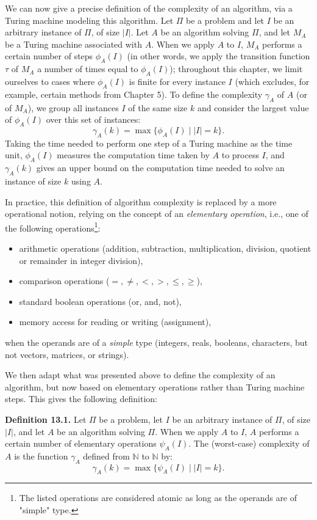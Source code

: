 We can now give a precise definition of the complexity of an algorithm, via a Turing machine modeling this algorithm. Let $\Pi$ be a problem and let $I$ be an arbitrary instance of $\Pi$, of size $|I|$. Let $A$ be an algorithm solving $\Pi$, and let $M_A$ be a Turing machine associated with $A$. When we apply $A$ to $I$, $M_A$ performs a certain number of steps $\phi_A(I)$ (in other words, we apply the transition function $\tau$ of $M_A$ a number of times equal to $\phi_A(I)$); throughout this chapter, we limit ourselves to cases where $\phi_A(I)$ is finite for every instance $I$ (which excludes, for example, certain methods from Chapter 5). To define the complexity $\gamma_A$ of $A$ (or of $M_A$), we group all instances $I$ of the same size $k$ and consider the largest value of $\phi_A(I)$ over this set of instances:
\[
\gamma_A(k) = \max\{\phi_A(I) \mid |I| = k\}.
\]
Taking the time needed to perform one step of a Turing machine as the time unit, $\phi_A(I)$ measures the computation time taken by $A$ to process $I$, and $\gamma_A(k)$ gives an upper bound on the computation time needed to solve an instance of size $k$ using $A$.

In practice, this definition of algorithm complexity is replaced by a more operational notion, relying on the concept of an \textit{elementary operation}, i.e., one of the following operations\footnote{The listed operations are considered atomic as long as the operands are of "simple" type.}:
\begin{itemize}
    \item arithmetic operations (addition, subtraction, multiplication, division, quotient or remainder in integer division),
    \item comparison operations ($=, \neq, <, >, \leq, \geq$),
    \item standard boolean operations (or, and, not),
    \item memory access for reading or writing (assignment),
\end{itemize}
when the operands are of a \textit{simple} type (integers, reals, booleans, characters, but not vectors, matrices, or strings).

We then adapt what was presented above to define the complexity of an algorithm, but now based on elementary operations rather than Turing machine steps. This gives the following definition:

\medskip
\noindent\textbf{Definition 13.1.} Let $\Pi$ be a problem, let $I$ be an arbitrary instance of $\Pi$, of size $|I|$, and let $A$ be an algorithm solving $\Pi$. When we apply $A$ to $I$, $A$ performs a certain number of elementary operations $\psi_A(I)$. The (worst-case) complexity of $A$ is the function $\gamma_A$ defined from $\mathbb{N}$ to $\mathbb{N}$ by:
\[
\gamma_A(k) = \max\{\psi_A(I) \mid |I| = k\}.
\]

